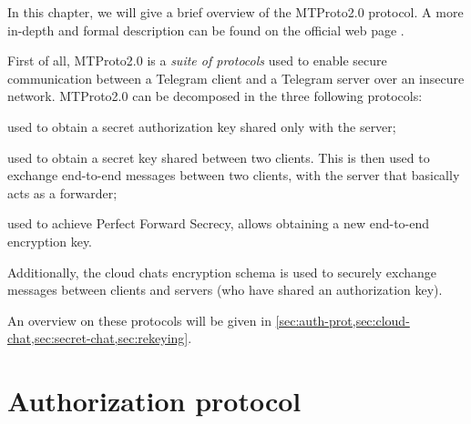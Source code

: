 
In this chapter, we will give a brief overview of the MTProto2.0 protocol. A more in-depth and formal description can be found on the official web page \cite{Telegram-MTProto2.0}.

First of all, MTProto2.0 is a \textit{suite of protocols} used to enable secure communication between a Telegram client and a Telegram server over an insecure network. MTProto2.0 can be decomposed in the three following protocols:

\begin{description}[style=nextline]
    \item[Authorization] used to obtain a secret authorization key shared only with the server;
    \item[Secret-chat] used to obtain a secret key shared between two clients. This is then used to exchange end-to-end messages between two clients, with the server that basically acts as a forwarder;
    \item[Rekeying] used to achieve Perfect Forward Secrecy, allows obtaining a new end-to-end encryption key.
\end{description}

Additionally, the cloud chats encryption schema is used to securely exchange messages between clients and servers (who have shared an authorization key).

An overview on these protocols will be given in \cref{sec:auth-prot,sec:cloud-chat,sec:secret-chat,sec:rekeying}.

\section{Authorization protocol}
\label{sec:auth-prot}

